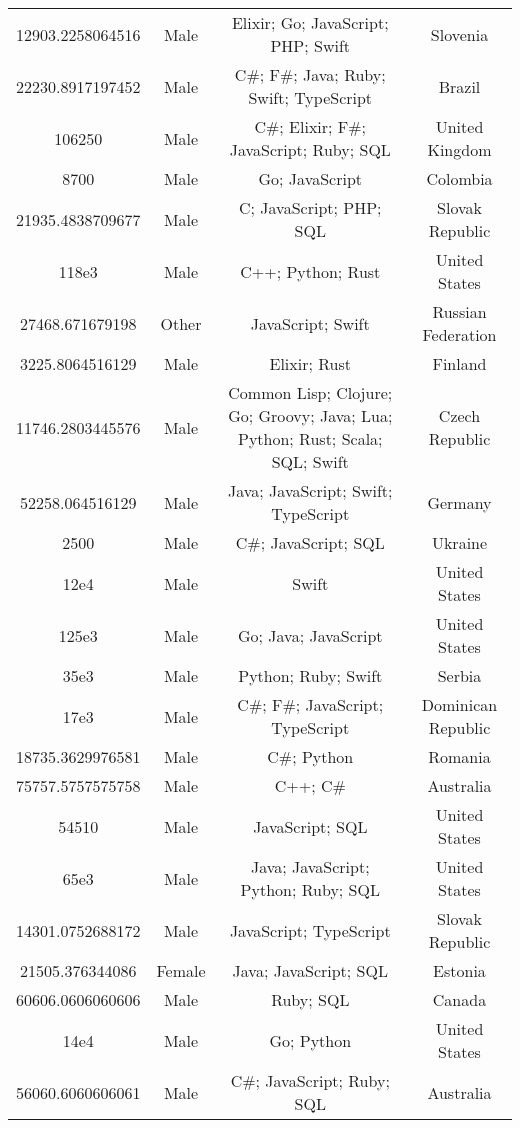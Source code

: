 \begin{center}
\begin{tabular}{ |c|c|c|c| }
12903.2258064516  &  Male  &  Elixir; Go; JavaScript; PHP; Swift  &  Slovenia  \\ 
22230.8917197452  &  Male  &  C\#; F\#; Java; Ruby; Swift; TypeScript  &  Brazil  \\ 
106250  &  Male  &  C\#; Elixir; F\#; JavaScript; Ruby; SQL  &  United Kingdom  \\ 
8700  &  Male  &  Go; JavaScript  &  Colombia  \\ 
21935.4838709677  &  Male  &  C; JavaScript; PHP; SQL  &  Slovak Republic  \\ 
118e3  &  Male  &  C++; Python; Rust  &  United States  \\ 
27468.671679198  &  Other  &  JavaScript; Swift  &  Russian Federation  \\ 
3225.8064516129  &  Male  &  Elixir; Rust  &  Finland  \\ 
11746.2803445576  &  Male  &  Common Lisp; Clojure; Go; Groovy; Java; Lua; Python; Rust; Scala; SQL; Swift  &  Czech Republic  \\ 
52258.064516129  &  Male  &  Java; JavaScript; Swift; TypeScript  &  Germany  \\ 
2500  &  Male  &  C\#; JavaScript; SQL  &  Ukraine  \\ 
12e4  &  Male  &  Swift  &  United States  \\ 
125e3  &  Male  &  Go; Java; JavaScript  &  United States  \\ 
35e3  &  Male  &  Python; Ruby; Swift  &  Serbia  \\ 
17e3  &  Male  &  C\#; F\#; JavaScript; TypeScript  &  Dominican Republic  \\ 
18735.3629976581  &  Male  &  C\#; Python  &  Romania  \\ 
75757.5757575758  &  Male  &  C++; C\#  &  Australia  \\ 
54510  &  Male  &  JavaScript; SQL  &  United States  \\ 
65e3  &  Male  &  Java; JavaScript; Python; Ruby; SQL  &  United States  \\ 
14301.0752688172  &  Male  &  JavaScript; TypeScript  &  Slovak Republic  \\ 
21505.376344086  &  Female  &  Java; JavaScript; SQL  &  Estonia  \\ 
60606.0606060606  &  Male  &  Ruby; SQL  &  Canada  \\ 
14e4  &  Male  &  Go; Python  &  United States  \\ 
56060.6060606061  &  Male  &  C\#; JavaScript; Ruby; SQL  &  Australia  \\ 

\end{tabular}
\end{center}

